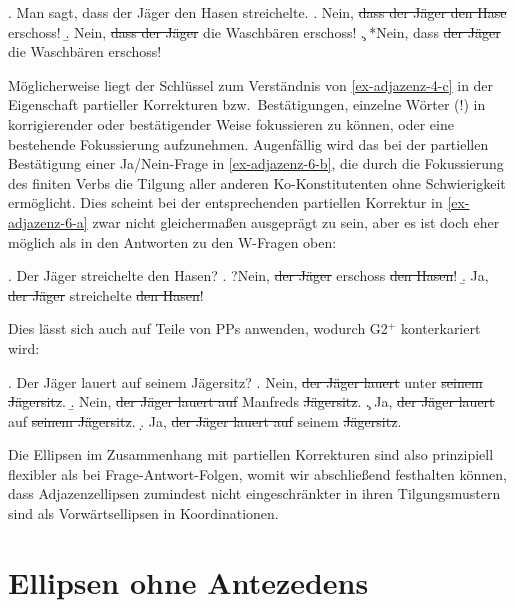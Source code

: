 \ex. \label{ex-adjazenz-5}Man sagt, dass der Jäger den Hasen streichelte.
\a. Nein, \sout{dass der Jäger den Hase} erschoss!
\b. Nein, \sout{dass der Jäger} die Waschbären erschoss!
\c. *Nein, dass \sout{der Jäger} die Waschbären erschoss!

Möglicherweise liegt der Schlüssel zum Verständnis von \ref{ex-adjazenz-4-c} in der Eigenschaft partieller Korrekturen bzw.\ Bestätigungen, einzelne Wörter (!) in korrigierender oder bestätigender Weise fokussieren zu können, oder eine bestehende  Fokussierung aufzunehmen. Augenfällig wird das bei der partiellen Bestätigung einer Ja/Nein-Frage in \ref{ex-adjazenz-6-b}, die durch die Fokussierung des finiten Verbs die Tilgung aller anderen Ko-Konstitutenten ohne Schwierigkeit ermöglicht. Dies scheint bei der entsprechenden partiellen Korrektur in \ref{ex-adjazenz-6-a} zwar nicht gleicherma\ss en ausgeprägt zu sein, aber es ist doch eher möglich als in den Antworten zu den W-Fragen oben:  

\ex. \label{ex-adjazenz-6}Der Jäger streichelte den Hasen?
\a. ?Nein, \sout{der Jäger} erschoss \sout{den Hasen}!\label{ex-adjazenz-6-a}
\b. Ja, \sout{der Jäger} streichelte \sout{den Hasen}!\label{ex-adjazenz-6-b}

Dies lässt sich auch auf Teile von PPs anwenden, wodurch G2$^+$ konterkariert wird:

\ex. \label{ex-adjazenz-7} Der Jäger lauert auf seinem Jägersitz?
\a. \label{ex-adjazenz-7} Nein, \sout{der Jäger lauert} unter \sout{seinem Jägersitz}. \b. Nein, \sout{der Jäger lauert auf} Manfreds \sout{Jägersitz}.
\c. Ja, \label{ex-adjazenz-7} \sout{der Jäger lauert} auf \sout{seinem Jägersitz}.
\d. Ja, \label{ex-adjazenz-7} \sout{der Jäger lauert auf} seinem \sout{Jägersitz}.

Die Ellipsen im Zusammenhang mit partiellen Korrekturen sind also prinzipiell flexibler als bei Frage-Antwort-Folgen, womit wir abschlie\ss end festhalten können, dass  Adjazenzellipsen zumindest nicht eingeschränkter in ihren Tilgungsmustern sind als Vorwärtsellipsen in Koordinationen.


\section{Ellipsen ohne Antezedens} \label{sec-situative-ellipsen}

